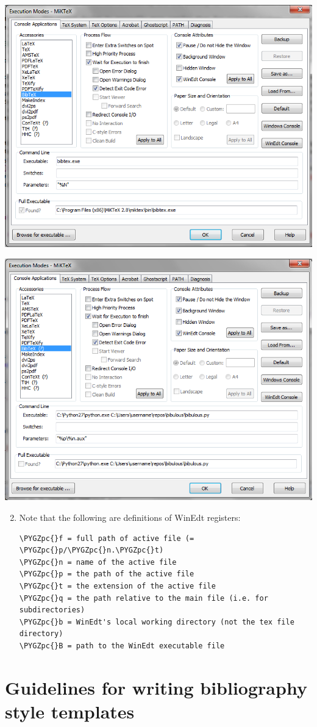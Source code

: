 \documentclass[letterpaper,10pt,english]{sphinxmanual}
\def\PYGZpc{\char`\%}
\begin{document}
\includegraphics[width=0.490\linewidth]{original_Winedt5_setup.png}

\includegraphics[width=0.490\linewidth]{modified_Winedt5_setup.png}
\begin{enumerate}
\setcounter{enumi}{1}
\item {} 
Note that the following are definitions of WinEdt registers:

\begin{Verbatim}[commandchars=\\\{\}]
\PYGZpc{}f = full path of active file (= \PYGZpc{}p/\PYGZpc{}n.\PYGZpc{}t)
\PYGZpc{}n = name of the active file
\PYGZpc{}p = the path of the active file
\PYGZpc{}t = the extension of the active file
\PYGZpc{}q = the path relative to the main file (i.e. for subdirectories)
\PYGZpc{}b = WinEdt's local working directory (not the tex file directory)
\PYGZpc{}B = path to the WinEdt executable file
\end{Verbatim}

\end{enumerate}


\chapter{Guidelines for writing bibliography style templates}
\label{guidelines_for_writing_style_templates:guidelines-for-writing-bibliography-style-templates}\label{guidelines_for_writing_style_templates::doc}
\end{document}
